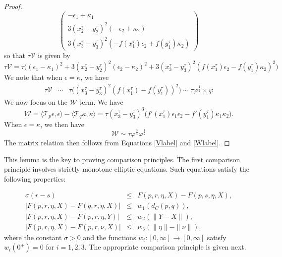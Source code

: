 \documentclass[reqno]{amsart}
\begin{document}
\begin{proof}
\begin{equation*}
\begin{pmatrix}
 -\epsilon_1+\kappa_1\\
 3(x_2^\tau-y_2^\tau)^2(-\epsilon_2+\kappa_2)\\ 
 3(x_3^\tau-y_3^\tau)^2(-f(x_1^\tau)\epsilon_2+f(y_1^\tau)\kappa_2)
 \end{pmatrix}
\end{equation*}
so that $\tau \mathcal{V}$ is given by 
\begin{equation*}
\tau\mathcal{V} = \tau\bigg((\epsilon_1-\kappa_1)^2+ 3(x_2^\tau-y_2^\tau)^2(\epsilon_2-\kappa_2)^2+  3(x_3^\tau-y_3^\tau)^2(f(x_1^\tau)\epsilon_2-f(y_1^\tau)\kappa_2)^2\bigg)
\end{equation*}
We note that when $\epsilon=\kappa$, we have 
\begin{eqnarray}\label{Vlabel}
\tau \mathcal{V} & \sim & \tau\bigg((x_3^\tau-y_3^\tau)^2(f(x_1^\tau)-f(y_1^\tau))^2\bigg) \sim \tau \varphi^{\frac{1}{2}} \times \varphi
\end{eqnarray}
We now focus on the $\mathcal{W}$ term. We have 
\begin{equation*}
\mathcal{W}=\langle \mathcal{T}_p\epsilon,\epsilon\rangle-\langle \mathcal{T}_q\kappa,\kappa\rangle =
\tau (x_3^\tau-y_3^\tau)^3\bigg(f'(x_1^\tau)\epsilon_1\epsilon_2-f'(y_1^\tau)\kappa_1\kappa_2\bigg).
\end{equation*}
When $\epsilon=\kappa$, we then have 
\begin{equation}\label{Wlabel}
\mathcal{W}\sim \tau\varphi^{\frac{3}{4}}\varphi^{\frac{1}{2}}
\end{equation}
The matrix relation then follows from Equations \eqref{Vlabel} and \eqref{Wlabel}. 
\end{proof}


This lemma is the key to proving comparison principles. The first comparison principle involves strictly monotone elliptic equations. Such equations satisfy the following properties:

\begin{eqnarray*}
\sigma(r-s)&\leq & F(p,r,\eta,X)-F(p,s,\eta,X),\\
|F(p,r,\eta,X)-F(q,r,\eta,X)|&\leq & w_1(d_C(p,q)),\\
|F(p,r,\eta,X)-F(p,r,\eta,Y)|&\leq & w_2(\|Y-X\|),\\
|F(p,r,\eta,X)-F(p,r,\nu,X)|&\leq & w_3(\|\eta\|-\|\nu\|),
\end{eqnarray*}
where the constant $\sigma>0$ and the functions $w_i:[0,\infty]\to[0,\infty]$ satisfy $w_i(0^+)=0$ for $i=1,2,3$. The appropriate comparison principle is given next.
\end{document}
